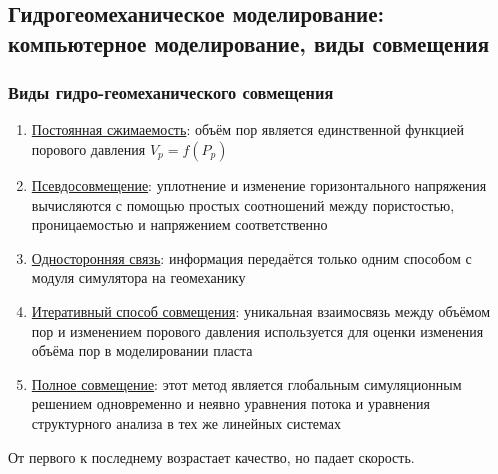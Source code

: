 \documentclass[main.tex]{subfiles}
\begin{document}
\subsection{Гидрогеомеханическое моделирование: компьютерное моделирование, виды совмещения}

\subsubsection{Виды гидро-геомеханического совмещения}

\begin{enumerate}
\item \underline{Постоянная сжимаемость}: объём пор является единственной функцией порового давления $V_p=f(P_p)$
\item \underline{Псевдосовмещение}: уплотнение и изменение горизонтального напряжения вычисляются с помощью простых соотношений между пористостью, проницаемостью и напряжением соответственно
\item \underline{Односторонняя связь}: информация передаётся только одним способом с модуля симулятора на геомеханику
\item \underline{Итеративный способ совмещения}: уникальная взаимосвязь между объёмом пор и изменением порового давления используется для оценки изменения объёма пор в моделировании пласта
\item \underline{Полное совмещение}: этот метод является глобальным симуляционным решением одновременно и неявно уравнения потока и уравнения структурного анализа в тех же линейных системах
\end{enumerate}

От первого к последнему возрастает качество, но падает скорость.


\end{document}

